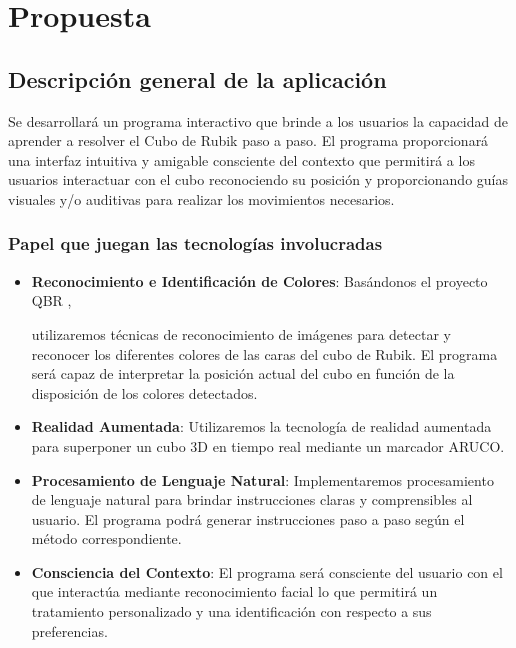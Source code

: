 \chapter{Propuesta}

\section{Descripción general de la aplicación}

Se desarrollará un programa interactivo que brinde a los usuarios la capacidad
de aprender a resolver el Cubo de Rubik paso a paso. El programa proporcionará
una interfaz intuitiva y amigable consciente del contexto que permitirá a los
usuarios interactuar con el cubo reconociendo su posición y proporcionando guías
visuales y/o auditivas para realizar los movimientos necesarios.

\subsection{Papel que juegan las tecnologías involucradas}

\begin{itemize}
\item{\textbf{Reconocimiento e Identificación de Colores}: Basándonos el proyecto QBR \cite{QBR},

utilizaremos técnicas de reconocimiento de imágenes para detectar y reconocer
los diferentes colores de las caras del cubo de Rubik. El programa será capaz de
interpretar la posición actual del cubo en función de la disposición de los
colores detectados.}

\item{ \textbf{Realidad Aumentada}: Utilizaremos la tecnología de realidad aumentada para
superponer un cubo 3D en tiempo real mediante un marcador ARUCO.}

\item{ \textbf{Procesamiento de Lenguaje Natural}: Implementaremos procesamiento de lenguaje
natural para brindar instrucciones claras y comprensibles al usuario. El
programa podrá generar instrucciones paso a paso según el método correspondiente.}

\item{ \textbf{Consciencia del Contexto}: El programa será consciente del usuario con el que
interactúa mediante reconocimiento facial lo que permitirá un tratamiento
personalizado y una identificación con respecto a sus preferencias.}



\end{itemize}
